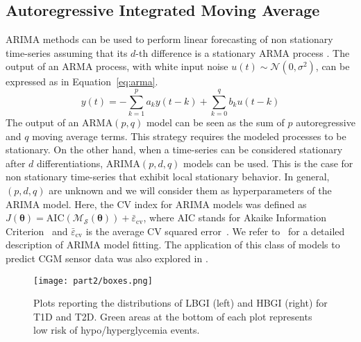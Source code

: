 

\subsection{Autoregressive Integrated Moving Average}
ARIMA methods can be used to perform linear forecasting of non stationary time-series assuming that its $d$-th difference is a stationary ARMA process  \cite{box2015time}. The output of an ARMA process, with white input noise $u(t)\sim\mathcal{N}(0,\sigma^2)$, can be expressed as in Equation~\eqref{eq:arma}.
\begin{equation} \label{eq:arma}
y(t) = -\sum_{k=1}^pa_ky(t-k)+\sum_{k=0}^qb_ku(t-k)
\end{equation}
The output of an ARMA$(p, q)$ model can be seen as the sum of $p$ autoregressive and $q$ moving average terms. This strategy requires the modeled processes to be stationary. On the other hand, when a time-series can be considered stationary after $d$ differentiations, ARIMA$(p, d, q)$ models can be used. 
This is the case for non stationary time-series that exhibit local stationary behavior. In general,  $(p, d, q)$ are unknown and we will consider them as hyperparameters of the ARIMA model.
Here, the CV index for ARIMA models was defined as $J(\bm{\theta})= \text{AIC}(\mathcal{M}_{\mathcal{S}}(\bm{\theta})) + \bar{\varepsilon}_{\text{cv}}$, where AIC stands for Akaike Information Criterion~ \cite{box2015time} and $\bar{\varepsilon}_{\text{cv}}$ is the  average CV squared error~\cite{everitt2006cambridge}.
We refer to~\cite{box2015time} for a detailed description of ARIMA model fitting.
The application of this class of models to predict CGM sensor data was also explored in \cite{sparacino2007glucose,bunescu2013blood}.

\begin{figure}[tb!]
	\caption{Plots reporting the distributions of LBGI (left) and HBGI (right) for T1D and T2D. Green areas at the bottom of each plot represents low risk of hypo/hyperglycemia events.
	}\label{fig:plots}
	\centering
	\texttt{[image: part2/boxes.png]}
\end{figure}

